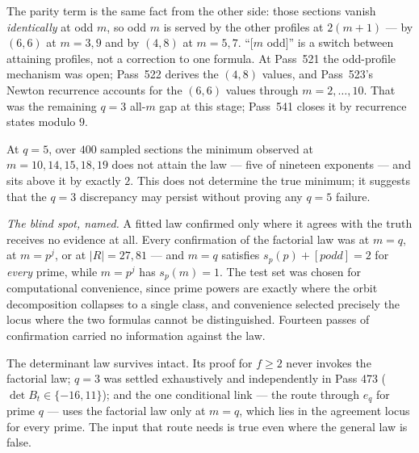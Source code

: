 \documentclass[12pt,a4paper]{article}
\def\text#1{#1}%
\theoremstyle{definition}
\begin{document}
The parity term is the same fact from the other side: those sections vanish
\emph{identically} at odd $m$, so odd $m$ is served by the other profiles at
$2(m+1)$ --- by $(6,6)$ at $m=3,9$ and by $(4,8)$ at $m=5,7$.  ``$[m$ odd$]$''
is a switch between attaining profiles, not a correction to one formula.  At
Pass~521 the odd-profile mechanism was open; Pass~522 derives the $(4,8)$
values, and Pass~523's Newton recurrence accounts for the $(6,6)$ values
through $m=2,\ldots,10$.  That was the remaining $q=3$ all-$m$ gap at this
stage; Pass~541 closes it by recurrence states modulo $9$.

At $q=5$, over $400$ sampled sections the minimum observed at
$m=10,14,15,18,19$ does not attain the law --- five of nineteen exponents ---
and sits above it by exactly $2$.  This does not determine the true minimum;
it suggests that the $q=3$ discrepancy may persist without proving any
$q=5$ failure.

\emph{The blind spot, named.}  A fitted law confirmed only where it agrees with
the truth receives no evidence at all.  Every confirmation of the factorial law
was at $m=q$, at $m=p^{j}$, or at $|R|=27,81$ --- and $m=q$ satisfies
$s_p(p)+[p\text{ odd}]=2$ for \emph{every} prime, while $m=p^{j}$ has
$s_p(m)=1$.  The test set was chosen for computational convenience, since prime
powers are exactly where the orbit decomposition collapses to a single class,
and convenience selected precisely the locus where the two formulas cannot be
distinguished.  Fourteen passes of confirmation carried no information against
the law.

The determinant law survives intact.  Its proof for $f\ge2$ never invokes the
factorial law; $q=3$ was settled exhaustively and independently in Pass 473
($\det B_t\in\{-16,11\}$); and the one conditional link --- the route through
$e_q$ for prime $q$ --- uses the factorial law only at $m=q$, which lies in the
agreement locus for every prime.  The input that route needs is true even where
the general law is false.
\end{document}
